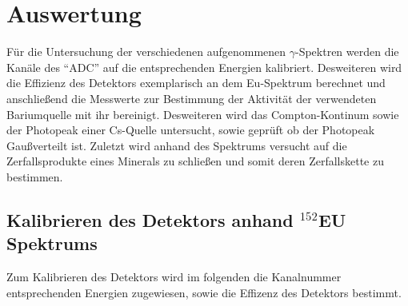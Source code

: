 \section{Auswertung}
\label{sec:Auswertung}
Für die Untersuchung der verschiedenen aufgenommenen $\gamma$-Spektren werden die Kanäle des ``ADC'' auf die entsprechenden Energien kalibriert. Desweiteren wird die Effizienz des Detektors exemplarisch an dem Eu-Spektrum berechnet und anschließend die Messwerte zur Bestimmung der Aktivität der verwendeten Bariumquelle mit ihr bereinigt. Desweiteren wird das Compton-Kontinum sowie der Photopeak einer Cs-Quelle untersucht, sowie geprüft ob der Photopeak Gaußverteilt ist. Zuletzt wird anhand des Spektrums versucht auf die Zerfallsprodukte eines Minerals zu schließen und somit deren Zerfallskette zu bestimmen.
\subsection{Kalibrieren des Detektors anhand $^{152}$EU Spektrums}
Zum Kalibrieren des Detektors wird im folgenden die Kanalnummer entsprechenden Energien zugewiesen, sowie die Effizenz des Detektors bestimmt.
